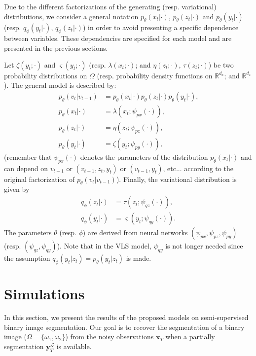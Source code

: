 \documentclass{article}
\def\x{{\mathbf x}}
\def\yl{{\mathbf y}_{T}^{\mathcal{L}}}
\def\p{p_{\theta}}
\def\q{q_\phi}
\begin{document}
Due to the different factorizations of the generating (resp. variational)
distributions, we consider a general notation
$\p(x_t | \cdot)$, $\p(z_t| \cdot)$ and $\p(y_t | \cdot)$ 
(resp. $\q(y_t | \cdot)$, $\q(z_t | \cdot)$) 
in order to avoid presenting a specific dependence between variables. 
These dependencies are specified for each model and are presented in the previous sections.

Let $\zeta(y_t; \cdot )$ and $ \varsigma(y_t;\cdot)$  (resp. $\lambda(x_t; \cdot )$; and $\eta(z_t;\cdot)$, $\tau(z_t;\cdot)$) 
be two probability distributions on $\Omega$
(resp. probability density functions on $\mathbb{R}^{d_x}$; and  $\mathbb{R}^{d_z}$ ).
The general model is described by:
\begin{align}
    \p(v_t|v_{t-1}) &=  \p(x_t|\cdot) \p(z_t|\cdot)\p(y_t|\cdot) \text{,} \nonumber\\
\label{eq:px}
    \p(x_t | \cdot) &= \lambda(x_t; \psi_{px}(\cdot) ) \text{,}\\
\label{eq:pz}
    \p(z_t | \cdot) &= \eta(z_t; \psi_{pz}(\cdot) ) \text{,}\\
\label{eq:py}
    \p(y_t | \cdot) &= \zeta(y_t;  \psi_{py}(\cdot)) \text{,}
\end{align}
(remember that $\psi_{px}(\cdot)$ denotes the parameters
of the distribution $\p(x_t | \cdot)$ and can depend 
on $v_{t-1}$ or $(v_{t-1},z_t,y_t)$ or $(v_{t-1},y_t)$, etc... according to the original factorization of $\p(v_t|v_{t-1})$). 
Finally, the variational distribution is given by
\begin{align}
\label{eq:qz}
    \q(z_t | \cdot) &=  \tau(z_t; \psi_{qz}(\cdot)) \text{,}\\
\label{eq:qy}
    \q(y_t | \cdot) &=  \varsigma(y_t;  \psi_{qy}(\cdot)) \text{.}
\end{align}
The parameters $\theta$ (resp. $\phi$) are derived from 
neural networks $(\psi_{px}, \psi_{pz}, \psi_{py})$ (resp.
$(\psi_{qz}, \psi_{qy})$).
Note that in the VLS model, $\psi_{qy}$ is not longer needed since 
the assumption $\q(y_t | z_t) = \p(y_t | z_t)$ is made.

\section{Simulations}
\label{sec:simulation}
In this section, we present the results of the proposed models on
semi-supervised binary image segmentation. Our goal is to recover the segmentation of a binary image 
($\Omega=\{\omega_1,\omega_2\}$) from the noisy observations
$\x_T$ when a partially segmentation $\yl$ is available.
\end{document}
